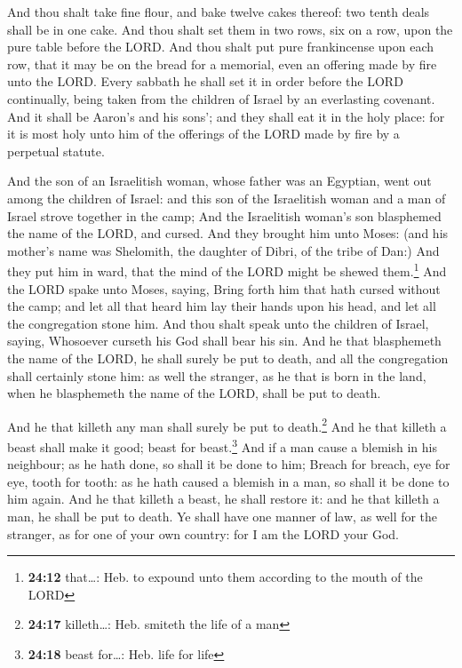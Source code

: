  And thou shalt take fine flour, and bake twelve cakes
thereof: two tenth deals shall be in one cake.  And thou
shalt set them in two rows, six on a row, upon the pure table before the
LORD.  And thou shalt put pure frankincense upon each row,
that it may be on the bread for a memorial, even an offering made by
fire unto the LORD.  Every sabbath he shall set it in
order before the LORD continually, being taken from the children of
Israel by an everlasting covenant.  And it shall be
Aaron's and his sons'; and they shall eat it in the holy place: for it
is most holy unto him of the offerings of the LORD made by fire by a
perpetual statute.

 And the son of an Israelitish woman, whose father was an
Egyptian, went out among the children of Israel: and this son of the
Israelitish woman and a man of Israel strove together in the camp;
 And the Israelitish woman's son blasphemed the name of
the LORD, and cursed. And they brought him unto Moses: (and his mother's
name was Shelomith, the daughter of Dibri, of the tribe of Dan:)
 And they put him in ward, that the mind of the LORD
might be shewed them.\footnote{\textbf{24:12} that\ldots: Heb. to
  expound unto them according to the mouth of the LORD} 
And the LORD spake unto Moses, saying,  Bring forth him
that hath cursed without the camp; and let all that heard him lay their
hands upon his head, and let all the congregation stone him.
 And thou shalt speak unto the children of Israel,
saying, Whosoever curseth his God shall bear his sin. 
And he that blasphemeth the name of the LORD, he shall surely be put to
death, and all the congregation shall certainly stone him: as well the
stranger, as he that is born in the land, when he blasphemeth the name
of the LORD, shall be put to death.

 And he that killeth any man shall surely be put to
death.\footnote{\textbf{24:17} killeth\ldots: Heb. smiteth the life of a
  man}  And he that killeth a beast shall make it good;
beast for beast.\footnote{\textbf{24:18} beast for\ldots: Heb. life for
  life}  And if a man cause a blemish in his neighbour;
as he hath done, so shall it be done to him;  Breach for
breach, eye for eye, tooth for tooth: as he hath caused a blemish in a
man, so shall it be done to him again.  And he that
killeth a beast, he shall restore it: and he that killeth a man, he
shall be put to death.  Ye shall have one manner of law,
as well for the stranger, as for one of your own country: for I am the
LORD your God.


